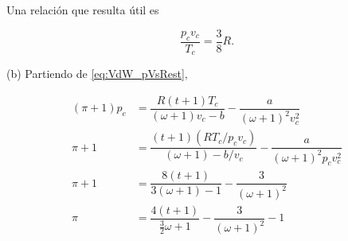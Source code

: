 \documentclass[10pt]{article}
\begin{document}
Una relaci\'on que resulta \'util es 

\begin{equation}
\dfrac{p_c v_c}{T_c} = \dfrac{3}{8}R.
\end{equation}

(b) Partiendo de \ref{eq:VdW_pVsRest},

\begin{align}
(\pi + 1)p_c &= \dfrac{R(t+1)T_c}{(\omega + 1)v_c-b} - \dfrac{a}{(\omega+1)^2v_c^2} \\
\pi + 1 &= \dfrac{(t+1)(RT_c/p_cv_c)}{(\omega + 1)-b/v_c} - \dfrac{a}{(\omega+1)^2p_cv_c^2} \\
\pi + 1 &= \dfrac{8(t+1)}{3(\omega + 1)-1} - \dfrac{3}{(\omega+1)^2}\\
\pi &= \dfrac{4(t+1)}{\frac{3}{2}\omega + 1} - \dfrac{3}{(\omega+1)^2} - 1
\end{align}
\end{document}
